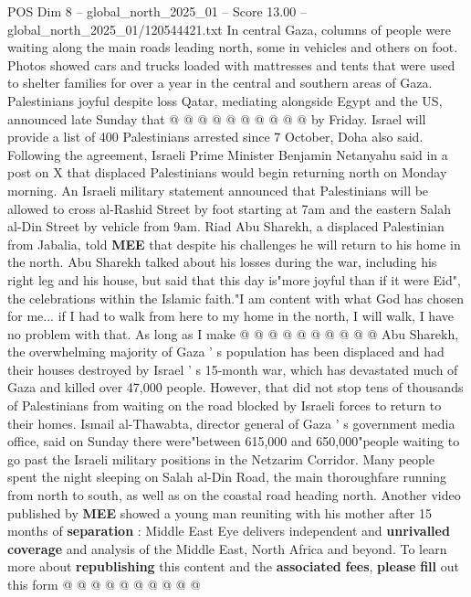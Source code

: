 \begin{textsample}{POS Dim 8 – global\_north\_2025\_01 – Score 13.00 – global\_north\_2025\_01/120544421.txt}
In central Gaza, columns of people were waiting along the main roads leading north, some in vehicles and others on foot.
Photos showed cars and trucks loaded with mattresses and tents that were used to shelter families for over a year in the central and southern areas of Gaza.
Palestinians joyful despite loss Qatar, mediating alongside Egypt and the US, announced late Sunday that @ @ @ @ @ @ @ @ @ @ by Friday.
Israel will provide a list of 400 Palestinians arrested since 7 October, Doha also said.
Following the agreement, Israeli Prime Minister Benjamin Netanyahu said in a post on X that displaced Palestinians would begin returning north on Monday morning.
An Israeli military statement announced that Palestinians will be allowed to cross al-Rashid Street by foot starting at 7am and the eastern Salah al-Din Street by vehicle from 9am.
Riad Abu Sharekh, a displaced Palestinian from Jabalia, told \textbf{MEE} that despite his challenges he will return to his home in the north.
Abu Sharekh talked about his losses during the war, including his right leg and his house, but said that this day is"more joyful than if it were Eid", the celebrations within the Islamic faith."I am content with what God has chosen for me... if I had to walk from here to my home in the north, I will walk, I have no problem with that.
As long as I make @ @ @ @ @ @ @ @ @ @ Abu Sharekh, the overwhelming majority of Gaza ' s population has been displaced and had their houses destroyed by Israel ' s 15-month war, which has devastated much of Gaza and killed over 47,000 people.
However, that did not stop tens of thousands of Palestinians from waiting on the road blocked by Israeli forces to return to their homes.
Ismail al-Thawabta, director general of Gaza ' s government media office, said on Sunday there were"between 615,000 and 650,000"people waiting to go past the Israeli military positions in the Netzarim Corridor.
Many people spent the night sleeping on Salah al-Din Road, the main thoroughfare running from north to south, as well as on the coastal road heading north.
Another video published by \textbf{MEE} showed a young man reuniting with his mother after 15 months of \textbf{separation} : Middle East Eye delivers independent and \textbf{unrivalled} \textbf{coverage} and analysis of the Middle East, North Africa and beyond.
To learn more about \textbf{republishing} this content and the \textbf{associated} \textbf{fees}, \textbf{please} \textbf{fill} out this form @ @ @ @ @ @ @ @ @ @

\end{textsample}
